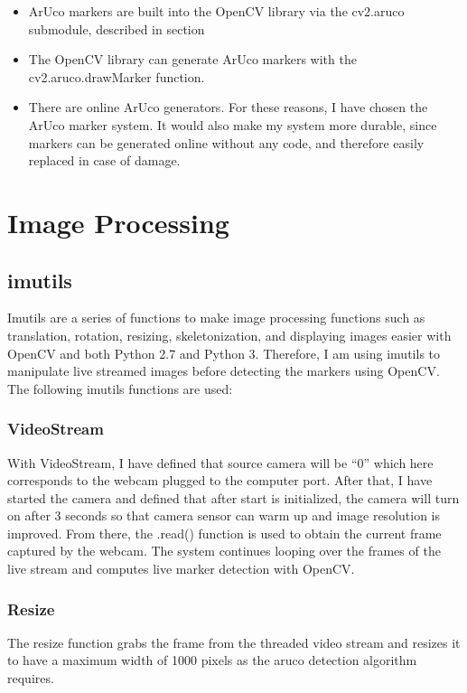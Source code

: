 \documentclass[oneside,%
                    author={Malak Hajji},
                    degree={BSc},
                    title={Designing An Accessible Computational Toolkit For Students},
                  subtitle={With Mixed Visual Abilities}]{dissertation}
\begin{document}
\begin{itemize}
  
\item ArUco markers are built into the OpenCV library via the cv2.aruco  submodule, described in section 
\item	The OpenCV library can generate ArUco markers with the cv2.aruco.drawMarker
 function.

\item	There are online ArUco generators.
For these reasons, I have chosen the ArUco marker system. It would also make my system more durable, since markers can be generated online without any code, and therefore easily replaced in case of damage.
\end{itemize}

\section{Image Processing} 
\subsection{imutils}

\noindent
Imutils are a series of functions to make image processing functions such as translation, rotation, resizing, skeletonization, and displaying images easier with OpenCV and both Python 2.7 and Python 3. Therefore, I am using imutils to manipulate live streamed images before detecting the markers using OpenCV. The following imutils functions are used:

\subsubsection{VideoStream}
With VideoStream, I have defined that source camera will be “0” which here corresponds to the webcam plugged to the computer port. After that, I have started the camera and defined that after start is initialized, the camera will turn on after 3 seconds so that camera sensor can warm up and image resolution is improved. From there, the .read() function is used to obtain the current frame captured by the webcam. The system continues looping over the frames of the live stream and computes live marker detection with 
OpenCV.

\subsubsection{Resize}
The resize function grabs the frame from the threaded video stream and resizes it to have a maximum width of 1000 pixels as the aruco detection algorithm requires.
\end{document}
